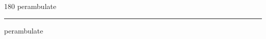 
\begin{frame}
\begin{center}
\begin{turn}{180}
{\fontsize{2.5cm}{1em}\selectfont perambulate}
\end{turn}
\vspace{1em}\par  
\hrule
\vspace{1em}\par  
{\fontsize{2.5cm}{1em}\selectfont perambulate}
\end{center}
\end{frame}
